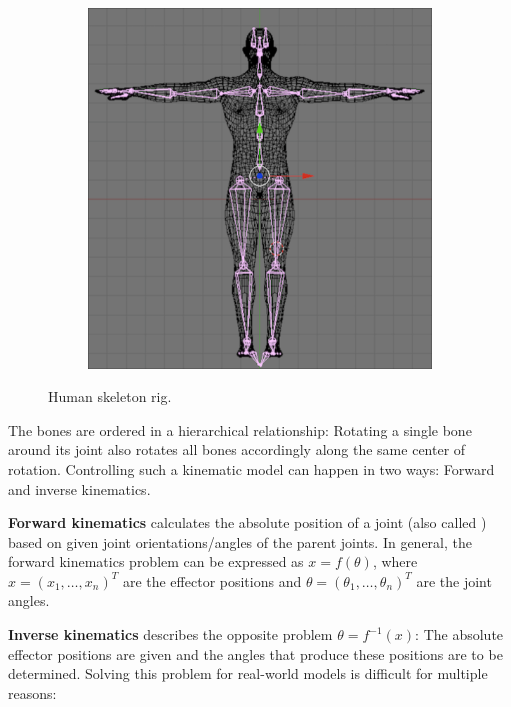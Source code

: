 \begin{figure}[h]
  \centering
  \begin{subfigure}[b]{0.3\textwidth}
	\includegraphics[scale=0.1]{img/human_rig.png}
  \end{subfigure}
  \caption{Human skeleton rig.~\autocite{computeranimation}}
  \label{fig:humanrig}
\end{figure}

The bones are ordered in a hierarchical relationship:
Rotating a single  bone around its joint also rotates all  bones accordingly along the same center of rotation.
Controlling such a kinematic model can happen in two ways: Forward and inverse kinematics.

\textbf{Forward kinematics} calculates the absolute position of a joint (also called ) based on given joint orientations/angles of the parent joints.
In general, the forward kinematics problem can be expressed as \(x=f(\theta)\),
where \(x=(x_1,\dots,x_n)^T\) are the effector positions and \(\theta=(\theta_1,\dots,\theta_n)^T\) are the joint angles.

\textbf{Inverse kinematics} describes the opposite problem \(\theta=f^{-1}(x)\):
The absolute effector positions are given and the angles that produce these positions are to be determined.
Solving this problem for real-world models is difficult for multiple reasons:

